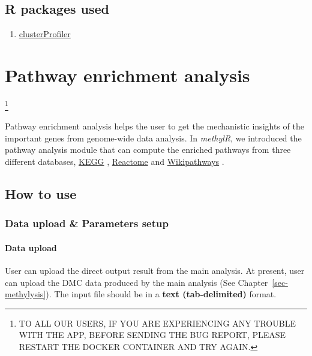 \documentclass[
  a4paper,
  oneside,
  open=any]{scrreport}
\providecommand{\tightlist}{%
  \setlength{\itemsep}{0pt}\setlength{\parskip}{0pt}}\usepackage{longtable,booktabs,array}
\begin{document}
\hypertarget{r-packages-used-4}{%
\section{R packages used}\label{r-packages-used-4}}

\begin{enumerate}
\def\labelenumi{\arabic{enumi}.}
\tightlist
\item
  \href{https://bioconductor.org/packages/release/bioc/vignettes/clusterProfiler/inst/doc/clusterProfiler.html}{clusterProfiler}
\end{enumerate}

\hypertarget{sec-pathway}{%
\chapter{Pathway enrichment analysis}\label{sec-pathway}}

\footnote{TO ALL OUR USERS, IF YOU ARE EXPERIENCING ANY TROUBLE WITH THE
  APP, BEFORE SENDING THE BUG REPORT, PLEASE RESTART THE DOCKER
  CONTAINER AND TRY AGAIN.}

Pathway enrichment analysis helps the user to get the mechanistic
insights of the important genes from genome-wide data analysis. In
\emph{methylR}, we introduced the pathway analysis module that can
compute the enriched pathways from three different databases,
\href{https://www.genome.jp/kegg/}{KEGG} \autocite{Kanehisa2000},
\href{https://reactome.org/}{Reactome} \autocite{Gillespie2021} and
\href{https://www.wikipathways.org/}{Wikipathways}
\autocite{pico2008plos,martens2020nar}.

\hypertarget{how-to-use-8}{%
\section{How to use}\label{how-to-use-8}}

\hypertarget{data-upload-parameters-setup-5}{%
\subsection{Data upload \& Parameters
setup}\label{data-upload-parameters-setup-5}}

\hypertarget{data-upload-5}{%
\subsubsection{Data upload}\label{data-upload-5}}

User can upload the direct output result from the main analysis. At
present, user can upload the DMC data produced by the main analysis (See
Chapter~\ref{sec-methylysis}). The input file should be in a
\textbf{text (tab-delimited)} format.
\end{document}
